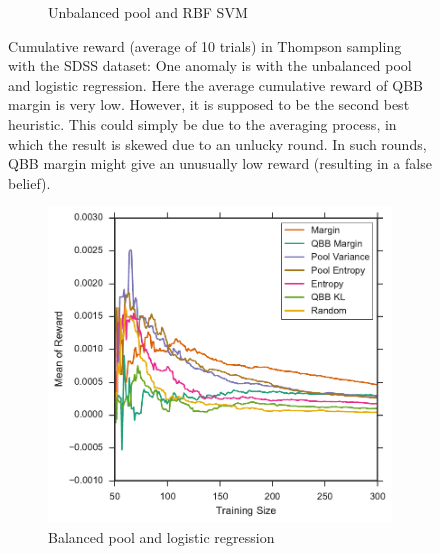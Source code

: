 \begin{figure}[p]
\begin{subfigure}{.5\textwidth}
		\caption{Unbalanced pool and RBF SVM}
		\label{fig:sdss_ur_sum_rewards}
	\end{subfigure}
	\caption[Cumulative reward of heuristics (SDSS)]{
		Cumulative reward (average of 10 trials) in Thompson sampling with the SDSS dataset: One anomaly is with the unbalanced pool and logistic regression. Here the average cumulative reward of QBB margin is very low. However, it is supposed to be the second best heuristic. This could simply be due to the averaging process, in which the result is skewed due to an unlucky round. In such rounds, QBB margin might give an unusually low reward (resulting in a false belief).}
	\label{fig:sdss_sum_rewards}
\end{figure}


\begin{figure}[p]
	\centering
	\begin{subfigure}{.5\textwidth}
		\centering
		\includegraphics[width=\textwidth]{figures/5_thompson/sdss_bl_avg_rewards}
		\caption{Balanced pool and logistic regression}
		\label{fig:sdss_bl_avg_rewards}
	\end{subfigure}%
	\begin{subfigure}{.5\textwidth}
		\centering

\end{subfigure}
\end{figure}
